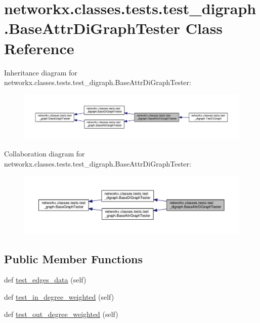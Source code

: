 \hypertarget{classnetworkx_1_1classes_1_1tests_1_1test__digraph_1_1BaseAttrDiGraphTester}{}\section{networkx.\+classes.\+tests.\+test\+\_\+digraph.\+Base\+Attr\+Di\+Graph\+Tester Class Reference}
\label{classnetworkx_1_1classes_1_1tests_1_1test__digraph_1_1BaseAttrDiGraphTester}


Inheritance diagram for networkx.\+classes.\+tests.\+test\+\_\+digraph.\+Base\+Attr\+Di\+Graph\+Tester\+:
\nopagebreak
\begin{figure}[H]
\begin{center}
\leavevmode
\includegraphics[width=350pt]{classnetworkx_1_1classes_1_1tests_1_1test__digraph_1_1BaseAttrDiGraphTester__inherit__graph}
\end{center}
\end{figure}


Collaboration diagram for networkx.\+classes.\+tests.\+test\+\_\+digraph.\+Base\+Attr\+Di\+Graph\+Tester\+:
\nopagebreak
\begin{figure}[H]
\begin{center}
\leavevmode
\includegraphics[width=350pt]{classnetworkx_1_1classes_1_1tests_1_1test__digraph_1_1BaseAttrDiGraphTester__coll__graph}
\end{center}
\end{figure}
\subsection*{Public Member Functions}
\begin{DoxyCompactItemize}
\item 
def \hyperlink{classnetworkx_1_1classes_1_1tests_1_1test__digraph_1_1BaseAttrDiGraphTester_ad85f47ae7534ca1875ceeda980503a12}{test\+\_\+edges\+\_\+data} (self)
\item 
def \hyperlink{classnetworkx_1_1classes_1_1tests_1_1test__digraph_1_1BaseAttrDiGraphTester_a7c427067f61c6a8aac26f34133837bbe}{test\+\_\+in\+\_\+degree\+\_\+weighted} (self)
\item 
def \hyperlink{classnetworkx_1_1classes_1_1tests_1_1test__digraph_1_1BaseAttrDiGraphTester_a380da2b68ec8b513d56b13223ab6c1f0}{test\+\_\+out\+\_\+degree\+\_\+weighted} (self)
\end{DoxyCompactItemize}

